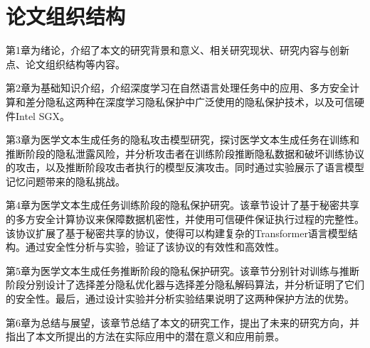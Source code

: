 \section{论文组织结构}

第1章为绪论，介绍了本文的研究背景和意义、相关研究现状、研究内容与创新点、论文组织结构等内容。

第2章为基础知识介绍，介绍深度学习在自然语言处理任务中的应用、多方安全计算和差分隐私这两种在深度学习隐私保护中广泛使用的隐私保护技术，以及可信硬件Intel SGX。

第3章为医学文本生成任务的隐私攻击模型研究，探讨医学文本生成任务在训练和推断阶段的隐私泄露风险，并分析攻击者在训练阶段推断隐私数据和破坏训练协议的攻击，以及推断阶段攻击者执行的模型反演攻击。同时通过实验展示了语言模型记忆问题带来的隐私挑战。

第4章为医学文本生成任务训练阶段的隐私保护研究。该章节设计了基于秘密共享的多方安全计算协议来保障数据机密性，并使用可信硬件保证执行过程的完整性。该协议扩展了基于秘密共享的协议，使得可以构建复杂的Transformer语言模型结构。通过安全性分析与实验，验证了该协议的有效性和高效性。

第5章为医学文本生成任务推断阶段的隐私保护研究。该章节分别针对训练与推断阶段分别设计了选择差分隐私优化器与选择差分隐私解码算法，并分析证明了它们的安全性。最后，通过设计实验并分析实验结果说明了这两种保护方法的优势。

第6章为总结与展望，该章节总结了本文的研究工作，提出了未来的研究方向，并指出了本文所提出的方法在实际应用中的潜在意义和应用前景。